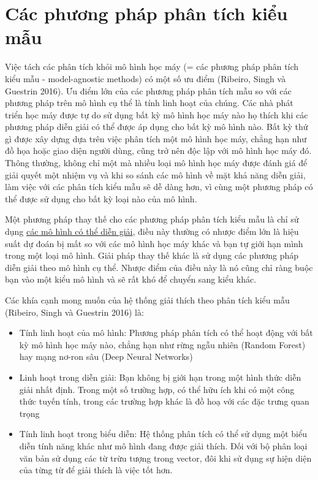 \chapter{Các phương pháp phân tích kiểu mẫu}

Việc tách các phân tích khỏi mô hình học máy (= các phương pháp phân tích kiểu mẫu - model-agnostic methods) có một số ưu điểm (Ribeiro, Singh và Guestrin 2016). Ưu điểm lớn của các phương pháp phân tích  mẫu so với các phương pháp trên mô hình cụ thể là tính linh hoạt của chúng. Các nhà phát triển học máy được tự do sử dụng bất kỳ mô hình học máy nào họ thích khi các phương pháp diễn giải có thể được áp dụng cho bất kỳ mô hình nào. Bất kỳ thứ gì được xây dựng dựa trên việc phân tích một mô hình học máy, chẳng hạn như đồ họa hoặc giao diện người dùng, cũng trở nên độc lập với mô hình học máy đó. Thông thường, không chỉ một mà nhiều loại mô hình học máy được đánh giá để giải quyết một nhiệm vụ và khi so sánh các mô hình về mặt khả năng diễn giải, làm việc với các phân tích kiểu mẫu sẽ dễ dàng hơn, vì cùng một phương pháp có thể được sử dụng cho bất kỳ loại nào của mô hình.

Một phương pháp thay thế cho các phương pháp phân tích kiểu mẫu là chỉ sử dụng \href{Chương 4}{các mô hình có thể diễn giải}, điều này thường có nhược điểm lớn là hiệu suất dự đoán bị mất so với các mô hình học máy khác và bạn tự giới hạn mình trong một loại mô hình. Giải pháp thay thế khác là sử dụng các phương pháp diễn giải theo mô hình cụ thể. Nhược điểm của điều này là nó cũng chỉ ràng buộc bạn vào một kiểu mô hình và sẽ rất khó để chuyển sang kiểu khác.

Các khía cạnh mong muốn của hệ thống giải thích theo phân tích kiểu mẫu (Ribeiro, Singh và Guestrin 2016) là:
\begin{itemize}
\item Tính linh hoạt của mô hình: Phương pháp phân tích có thể hoạt động với bất kỳ mô hình học máy nào, chẳng hạn như rừng ngẫu nhiên (Random Forest) hay mạng nơ-ron sâu (Deep Neural Networks)
\item Linh hoạt trong diễn giải: Bạn không bị giới hạn trong một hình thức diễn giải nhất định. Trong một số trường hợp, có thể hữu ích khi có một công thức tuyến tính, trong các trường hợp khác là đồ hoạ với các đặc trưng quan trọng
\item Tính linh hoạt trong biểu diễn: Hệ thống phân tích có thể sử dụng một biểu diễn tính năng khác như mô hình đang được giải thích. Đối với bộ phân loại văn bản sử dụng các từ trừu tượng trong vector, đôi khi sử dụng sự hiện diện của từng từ để giải thích là việc tốt hơn.
\end{itemize}

